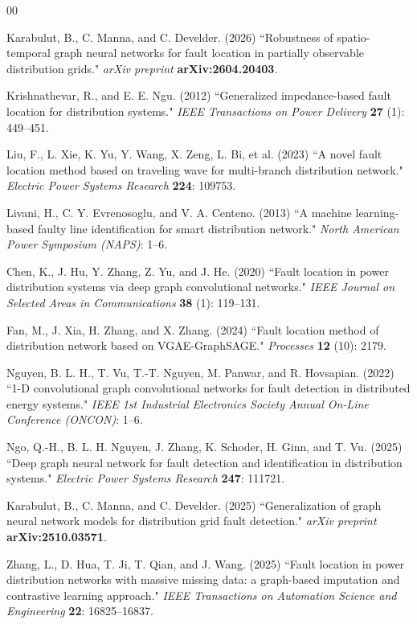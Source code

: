 \documentclass[3p,times,procedia]{elsarticle}
\begin{document}
\begin{thebibliography}{00}

Karabulut, B., C. Manna, and C. Develder. (2026) ``Robustness
of spatio-temporal graph neural networks for fault location in
partially observable distribution grids." {\it arXiv preprint}
{\bf arXiv:2604.20403}.

Krishnathevar, R., and E. E. Ngu. (2012) ``Generalized impedance-based
fault location for distribution systems." {\it IEEE Transactions on
Power Delivery} {\bf 27} (1): 449--451.

Liu, F., L. Xie, K. Yu, Y. Wang, X. Zeng, L. Bi, et al. (2023) ``A novel
fault location method based on traveling wave for multi-branch
distribution network." {\it Electric Power Systems Research} {\bf 224}:
109753.

Livani, H., C. Y. Evrenosoglu, and V. A. Centeno. (2013) ``A machine
learning-based faulty line identification for smart distribution
network." {\it North American Power Symposium (NAPS)}: 1--6.

Chen, K., J. Hu, Y. Zhang, Z. Yu, and J. He. (2020) ``Fault location in
power distribution systems via deep graph convolutional networks."
{\it IEEE Journal on Selected Areas in Communications} {\bf 38} (1):
119--131.

Fan, M., J. Xia, H. Zhang, and X. Zhang. (2024) ``Fault location method
of distribution network based on VGAE-GraphSAGE." {\it Processes}
{\bf 12} (10): 2179.

Nguyen, B. L. H., T. Vu, T.-T. Nguyen, M. Panwar, and R. Hovsapian.
(2022) ``1-D convolutional graph convolutional networks for fault
detection in distributed energy systems." {\it IEEE 1st Industrial
Electronics Society Annual On-Line Conference (ONCON)}: 1--6.

Ngo, Q.-H., B. L. H. Nguyen, J. Zhang, K. Schoder, H. Ginn, and T. Vu.
(2025) ``Deep graph neural network for fault detection and
identification in distribution systems." {\it Electric Power Systems
Research} {\bf 247}: 111721.

Karabulut, B., C. Manna, and C. Develder. (2025)
``Generalization of graph neural network models for distribution
grid fault detection." {\it arXiv preprint} {\bf arXiv:2510.03571}.

Zhang, L., D. Hua, T. Ji, T. Qian, and J. Wang. (2025) ``Fault location in power distribution networks
with massive missing data: a graph-based imputation and contrastive
learning approach." {\it IEEE Transactions on Automation Science and
Engineering} {\bf 22}: 16825--16837.


\end{thebibliography}
\end{document}
